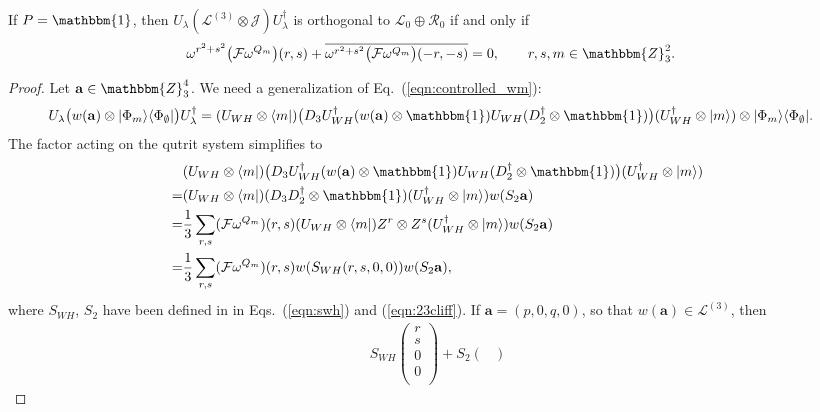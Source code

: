 \documentclass[10pt,a4paper]{amsart}
\def\F{\mathcal{F}}
\def\Id{\mathbbm{1}}
\def\J{\mathcal{J}}
\def\ZZ{\mathbbm{Z}}
\renewcommand{\vec}{\mathbf}
\begin{document}
\begin{lemma}\label{lem:k_lemma}
	If
	$P=\Id$,
	then
	$U_\lambda (\mathcal{L}^{(3)}\otimes \J) U_\lambda^\dagger$ is orthogonal to 
	$\mathcal{L}_0 \oplus \mathcal{R}_0$
	if and only if
	\begin{align}\label{eqn:k_orth_cond}
		\omega^{r^2+s^2} \big(\F \omega^{Q_m}\big)(r,s) 
		+
		\overline{
			\omega^{r^2+s^2} \big(\F \omega^{Q_m}\big)(-r,-s)  
		} %
		&=0,
		\qquad
		r,s,m\in\ZZ_3^2.
	\end{align}
\end{lemma}

\begin{proof}
	Let $\vec a \in\ZZ_3^4$.
	We need a generalization of Eq.~(\ref{eqn:controlled_wm}):
	\begin{align*}
		U_\lambda
		\big(
			w(\vec a)
			\otimes |\Phi_m\rangle\langle\Phi_\emptyset|
		\big)
		U_\lambda^\dagger
		&=
		(U_{WH}\otimes \langle m|) \big(
			D_3 U_{WH}^\dagger (w(\vec a) \otimes \Id) U_{WH} (D_2^\dagger\otimes \Id)
		\big)
		(U_{WH}^\dagger\otimes|m\rangle)
			\otimes |\Phi_m\rangle\langle\Phi_\emptyset|.
	\end{align*}
	The factor acting on the qutrit system simplifies to
	\begin{align*}
		&
		(U_{WH}\otimes \langle m|) \big(
			D_3 U_{WH}^\dagger (w(\vec a) \otimes \Id) U_{WH} (D_2^\dagger\otimes \Id)
		\big)
		(U_{WH}^\dagger\otimes|m\rangle)
		\nonumber \\
		=&
		(U_{WH}\otimes \langle m|) 
			(D_3 D_2^\dagger\otimes \Id)
		(U_{WH}^\dagger\otimes|m\rangle) 
		w(S_2 \vec a)
		\nonumber \\
		=&
		\frac1{3}
		\sum_{r,s}
		(\F \omega^{Q_m})(r,s)
		(U_{WH}\otimes \langle m|) 
			Z^r\otimes Z^s
		(U_{WH}^\dagger\otimes|m\rangle) 
			w(S_2 \vec a)
		\nonumber 
			\\
		=&
		\frac1{3}
		\sum_{r,s}
		(\F \omega^{Q_m})(r,s)
		w(S_{WH} (r,s,0,0)) w(S_2 \vec a)
		,
	\end{align*}
	where $S_{WH}$, $S_2$ have been defined in in Eqs.~(\ref{eqn:swh}) and (\ref{eqn:23cliff}).
	If $\vec a = (p,0,q,0)$, so that $w(\vec a) \in \mathcal{L}^{(3)}$, then
	\begin{align*}
		S_{WH} 
		\begin{pmatrix}
			r\\
			s\\
			0\\
			0\\
		\end{pmatrix}
		+
		S_2 
		\begin{pmatrix}

\end{pmatrix}
\end{align*}
\end{proof}
\end{document}

